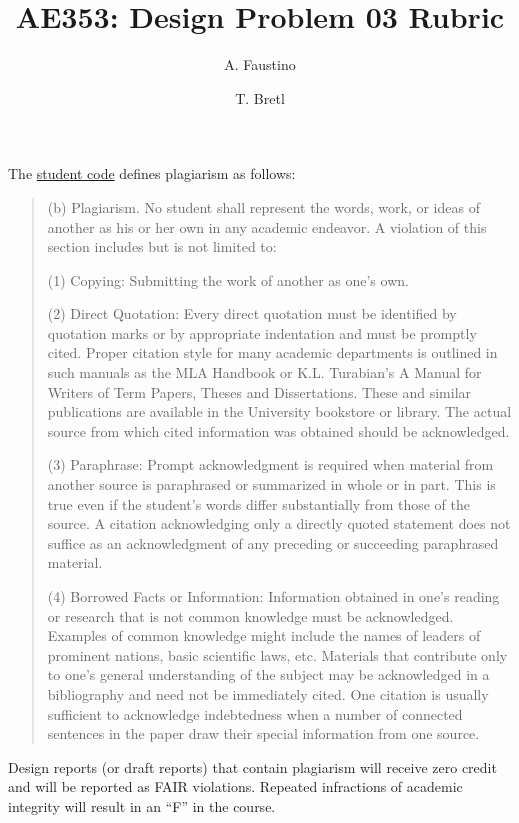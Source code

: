 \documentclass[12pt]{article}
\title{AE353: Design Problem 03 Rubric}
\author{A. Faustino \and T. Bretl}
\begin{document}
\maketitle

\begin{framed}
	The \href{http://studentcode.illinois.edu/article1_part4_1-402.html}{student code} defines plagiarism as follows:
	\begin{quote}
		(b) Plagiarism. No student shall represent the words, work, or ideas of another as his or her own in any academic endeavor. A violation of this section includes but is not limited to:
		
		(1)	Copying: Submitting the work of another as one's own. 
		
		(2)	Direct Quotation: Every direct quotation must be identified by quotation marks or by appropriate indentation and must be promptly cited. Proper citation style for many academic departments is outlined in such manuals as the MLA Handbook or K.L. Turabian's A Manual for Writers of Term Papers, Theses and Dissertations. These and similar publications are available in the University bookstore or library. The actual source from which cited information was obtained should be acknowledged.
		
		(3)	Paraphrase: Prompt acknowledgment is required when material from another source is paraphrased or summarized in whole or in part. This is true even if the student's words differ substantially from those of the source. A citation acknowledging only a directly quoted statement does not suffice as an acknowledgment of any preceding or succeeding paraphrased material. 
		
		(4)	Borrowed Facts or Information: Information obtained in one's reading or research that is not common knowledge must be acknowledged. Examples of common knowledge might include the names of leaders of prominent nations, basic scientific laws, etc. Materials that contribute only to one's general understanding of the subject may be acknowledged in a bibliography and need not be immediately cited. One citation is usually sufficient to acknowledge indebtedness when a number of connected sentences in the paper draw their special information from one source.
	\end{quote}
	Design reports (or draft reports) that contain plagiarism will receive zero credit and will be reported as FAIR violations. Repeated infractions of academic integrity will result in an ``F'' in the course.
\end{framed}
\end{document}
